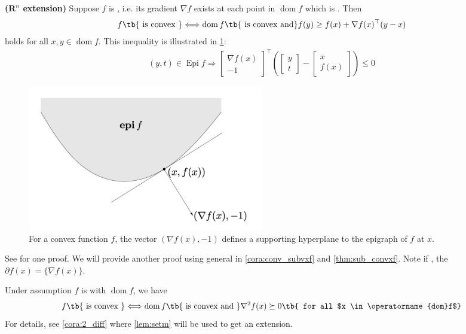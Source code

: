 \documentclass{article}
\newcommand{\bfs}[1]{\textbf{({#1}) }}
\newcommand{\dom}{\operatorname{dom}}
\newcommand{\Epi}{\operatorname{Epi} }
\begin{document}
\begin{rema}{\bfs{$\mathbf{R}^{n}$ extension}}
Suppose $f$ is , i.e. its gradient $\nabla f$ exists at each point in $\dom  f$ which is . Then
\begin{align*}
f\text{\tb{ is convex }}\Longleftrightarrow\dom  f\text{\tb{ is convex and}} f(y) \geq f(x)+\nabla f(x)^{\top}(y-x)
\end{align*}
holds for all $x, y \in \dom  f$. This inequality is illustrated in \cref{fig:supp_conx}:
\begin{align*}
(y, t) \in \Epi  f \Longrightarrow\left[\begin{array}{c}
\nabla f(x) \\
-1
\end{array}\right]^{\top}\left(\left[\begin{array}{l}
y \\
t
\end{array}\right]-\left[\begin{array}{c}
x \\
f(x)
\end{array}\right]\right) \leq 0
\end{align*}
\begin{figure}
    \centering
    \includegraphics[width=0.5\textwidth]{Figs/6.png}
    \caption{For a  convex function $f$, the vector $(\nabla f(x),-1)$ defines a supporting hyperplane to the epigraph of $f$ at $x$.}
    \label{fig:supp_conx}
\end{figure}
See \cite[page 70]{boyd2004convex} for one proof. We will provide another proof using general  in \cref{cora:conv_subvxf} and \cref{thm:sub_convxf}. Note if , the  $\partial f(x)=\{\nabla f(x)\}$.

Under assumption $f$ is  with  $\dom f$, we have 
\begin{align*}
f\text{\tb{ is convex }}\Longleftrightarrow\dom  f\text{\tb{ is convex and }} \nabla^{2} f(x) \succeq 0 \tb{ for all $x \in \dom  f$}
\end{align*}
For details, see \cref{cora:2_diff} where \cref{lem:setm} will be used to get an extension.
\end{rema}
\end{document}
